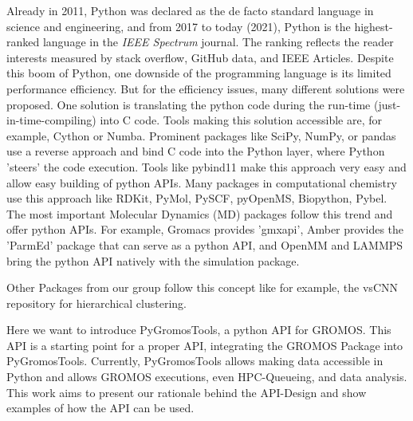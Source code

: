 Already in 2011, Python was declared as the de facto standard language in science and engineering, and from 2017 to today (2021), Python is the highest-ranked language in the \textit{IEEE Spectrum} journal. The ranking reflects the reader interests measured by stack overflow, GitHub data, and IEEE Articles. \cite{Millman2011, Cass2017, Cass2018, Cass2019, Cass2020, Cass2021} 
Despite this boom of Python, one downside of the programming language is its limited performance efficiency. But for the efficiency issues, many different solutions were proposed. One solution is translating the python code during the run-time (just-in-time-compiling) into C code. Tools making this solution accessible are, for example, Cython or Numba. \cite{behnel2011, Lam2015} 
Prominent packages like SciPy, NumPy, or pandas use a reverse approach and bind C code into the Python layer, where Python 'steers' the code execution.  \cite{VanDerWalt2011, Virtanen2020, Mckinney2010, Oliphant2007} 
Tools like pybind11 make this approach very easy and allow easy building of python APIs. \cite{Wenzel2017}
Many packages in computational chemistry use this approach like RDKit, PyMol, PySCF, pyOpenMS, Biopython, Pybel. \cite{landrum2021, DeLano2020, Sun2018, Röst2014, Cock2009, O'Boyle2008}
The most important Molecular Dynamics (MD) packages follow this trend and offer python APIs. For example, Gromacs provides 'gmxapi', Amber provides the 'ParmEd' package that can serve as a python API, and OpenMM and LAMMPS bring the python API natively with the simulation package. \cite{BERENDSEN199543, Lindahl2001, Irrgang2018, Eastman2017, Case2005, Shirts2017, Thompson2022, Talirz2021}

Other Packages from our group follow this concept like for example, the vsCNN repository for hierarchical clustering. \cite{Weiß2021}

Here we want to introduce PyGromosTools, a python API for GROMOS. \cite{Lehner2021} This API is a starting point for a proper API, integrating the GROMOS Package into PyGromosTools. Currently, PyGromosTools allows making data accessible in Python and allows GROMOS executions, even HPC-Queueing, and data analysis. This work aims to present our rationale behind the API-Design and show examples of how the API can be used.

